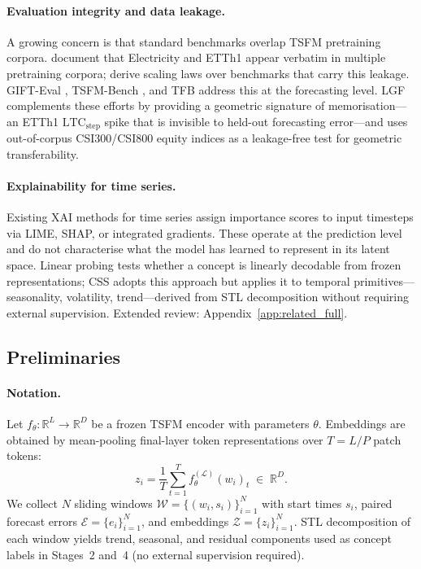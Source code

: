 \documentclass[10pt]{article}
\theoremstyle{definition}
\theoremstyle{remark}
\newcommand{\R}{\mathbb{R}}
\newcommand{\Zset}{\mathcal{Z}}
\newcommand{\ltcstep}{\ensuremath{\mathrm{LTC}_{\mathrm{step}}}}
\begin{document}
\paragraph{Evaluation integrity and data leakage.}
A growing concern is that standard benchmarks overlap TSFM pretraining corpora.
\citet{meyer2025tsfmreview} document that Electricity and ETTh1 appear verbatim
in multiple pretraining corpora; \citet{edwards2024scalinglaws} derive scaling
laws over benchmarks that carry this leakage.
GIFT-Eval \citep{aksu2024gifteval}, TSFM-Bench \citep{li2025tsfmbench}, and
TFB \citep{qiu2024tfb} address this at the forecasting level.
LGF complements these efforts by providing a geometric signature of
memorisation---an ETTh1 $\ltcstep$ spike that is invisible to held-out
forecasting error---and uses out-of-corpus CSI300/CSI800 equity indices as a
leakage-free test for geometric transferability.

\paragraph{Explainability for time series.}
Existing XAI methods for time series
\citep{ismail2020benchmarking,theissler2022explainable} assign importance
scores to input timesteps via LIME, SHAP, or integrated gradients.
These operate at the prediction level and do not characterise what the model
has learned to represent in its latent space.
Linear probing \citep{alain2017probing} tests whether a concept is linearly
decodable from frozen representations; CSS adopts this approach but applies it
to temporal primitives---seasonality, volatility, trend---derived from STL
decomposition \citep{cleveland1990stl} without requiring external supervision.
Extended review: Appendix~\ref{app:related_full}.

\subsection{Preliminaries}
\label{sec:prelim}

\paragraph{Notation.}
Let $f_\theta: \R^L \to \R^D$ be a frozen TSFM encoder with parameters
$\theta$.
Embeddings are obtained by mean-pooling final-layer token representations
over $T{=}L/P$ patch tokens:
\[
  z_i = \frac{1}{T}\sum_{t=1}^{T} f_\theta^{(\mathcal{L})}(w_i)_t \;\in\; \R^D.
\]
We collect $N$ sliding windows $\mathcal{W}{=}\{(w_i,s_i)\}_{i=1}^N$ with
start times $s_i$, paired forecast errors $\mathcal{E}{=}\{e_i\}_{i=1}^N$,
and embeddings $\Zset{=}\{z_i\}_{i=1}^N$.
STL decomposition \citep{cleveland1990stl} of each window yields trend, seasonal,
and residual components used as concept labels in Stages~2 and~4 (no external
supervision required).
\end{document}
